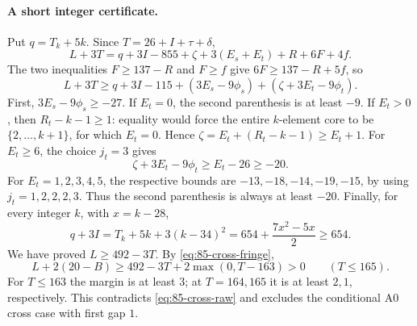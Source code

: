 \paragraph{A short integer certificate.}
Put $q=T_k+5k$. Since $T=26+I+\tau+\delta$,
\[
 L+3T=q+3I-855+\zeta+3(E_s+E_t)+R+6F+4f.
\]
The two inequalities $F\ge137-R$ and $F\ge f$ give
$6F\ge137-R+5f$, so
\[
 L+3T\ge q+3I-115
 +(3E_s-9\phi_s)+(\zeta+3E_t-9\phi_t).
\]
First, $3E_s-9\phi_s\ge-27$.
If $E_t=0$, the second parenthesis is at least $-9$.
If $E_t>0$, then $R_t-k-1\ge1$: equality would force the entire
$k$-element core to be $\{2,\ldots,k+1\}$, for which $E_t=0$.
Hence $\zeta=E_t+(R_t-k-1)\ge E_t+1$.
For $E_t\ge6$, the choice $j_t=3$ gives
\[
 \zeta+3E_t-9\phi_t\ge E_t-26\ge-20.
\]
For $E_t=1,2,3,4,5$, the respective bounds are
$-13,-18,-14,-19,-15$, by using $j_t=1,2,2,2,3$.
Thus the second parenthesis is always at least $-20$.
Finally, for every integer $k$, with $x=k-28$,
\[
 q+3I=T_k+5k+3(k-34)^2
 =654+\frac{7x^2-5x}{2}\ge654.
\]
We have proved $L\ge492-3T$. By \eqref{eq:85-cross-fringe},
\[
 L+2(20-B)\ge492-3T+2\max(0,T-163)>0
 \qquad(T\le165).
\]
For $T\le163$ the margin is at least $3$; at $T=164,165$ it is at
least $2,1$, respectively. This contradicts \eqref{eq:85-cross-raw}
and excludes the conditional A0 cross case with first gap $1$.
